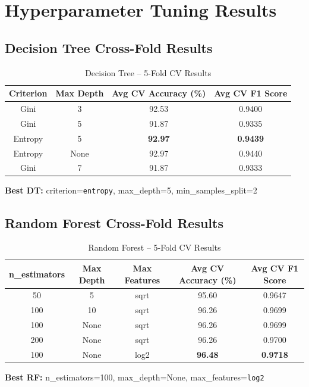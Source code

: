 \documentclass[11pt]{article}
\begin{document}
\section*{Hyperparameter Tuning Results}

\subsection*{Decision Tree Cross-Fold Results}
\begin{table}[H]
\centering
\caption{Decision Tree -- 5-Fold CV Results}
\begin{tabular}{cccc}
\toprule
Criterion & Max Depth & Avg CV Accuracy (\%) & Avg CV F1 Score \\
\midrule
Gini     & 3       & 92.53 & 0.9400 \\
Gini     & 5       & 91.87 & 0.9335 \\
Entropy  & 5       & \textbf{92.97} & \textbf{0.9439} \\
Entropy  & None    & 92.97 & 0.9440 \\
Gini     & 7       & 91.87 & 0.9333 \\
\bottomrule
\end{tabular}
\end{table}

\textbf{Best DT:} criterion=\texttt{entropy}, max\_depth=5, min\_samples\_split=2

\subsection*{Random Forest Cross-Fold Results}
\begin{table}[H]
\centering
\caption{Random Forest -- 5-Fold CV Results}
\begin{tabular}{ccccc}
\toprule
n\_estimators & Max Depth & Max Features & Avg CV Accuracy (\%) & Avg CV F1 Score \\
\midrule
50  & 5    & sqrt & 95.60 & 0.9647 \\
100 & 10   & sqrt & 96.26 & 0.9699 \\
100 & None & sqrt & 96.26 & 0.9699 \\
200 & None & sqrt & 96.26 & 0.9700 \\
100 & None & log2 & \textbf{96.48} & \textbf{0.9718} \\
\bottomrule
\end{tabular}
\end{table}

\textbf{Best RF:} n\_estimators=100, max\_depth=None, max\_features=\texttt{log2}
\end{document}
